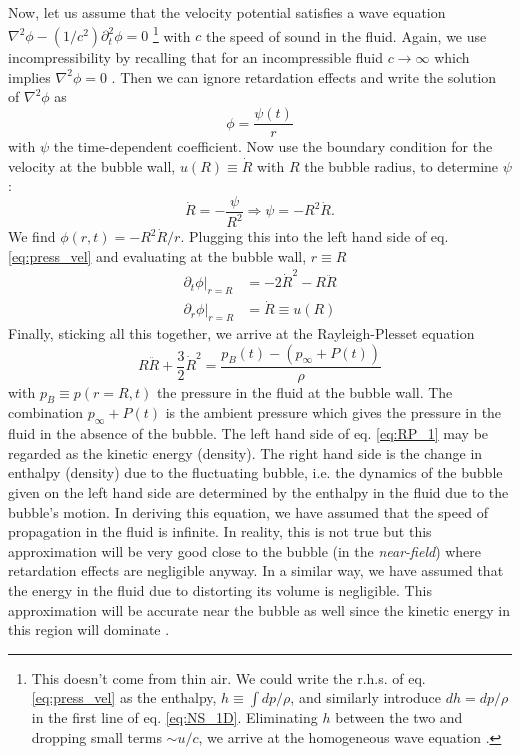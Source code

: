 \documentclass[prb,aps,nofootinbib,superscriptaddress,floatfix]{revtex4-2}
\begin{document}
Now, let us assume that the velocity potential satisfies a wave equation $\nabla^2 \phi - (1/c^2)\partial_t^2 \phi =0 $ \footnote{This doesn't come from thin air. We could write the r.h.s. of eq. \ref{eq:press_vel} as the enthalpy, $h\equiv \int dp/\rho$, and similarly introduce $dh=dp/\rho$ in the first line of eq. \ref{eq:NS_1D}. Eliminating $h$ between the two and dropping small terms $\sim u/c$, we arrive at the homogeneous wave equation \cite{leighton2007derivation,brenner2002single,prosperetti1999old}.} with $c$ the speed of sound in the fluid. Again, we use incompressibility by recalling that for an incompressible fluid $c\rightarrow \infty$ which implies $\nabla^2 \phi =0$ \cite{prosperetti1999old,prosperetti1986bubble,leighton2007derivation}. Then we can ignore retardation effects and write the solution of $\nabla^2 \phi$ as 
\begin{equation}
    \phi = \frac{\psi(t)}{r}
\end{equation}
with $\psi$ the time-dependent coefficient. Now use the boundary condition for the velocity at the bubble wall, $u(R)\equiv \dot{R}$ with $R$ the bubble radius, to determine $\psi$:
\begin{equation}
    \dot{R} = -\frac{\psi}{R^2} \Rightarrow \psi = -R^2 \dot{R}.
\end{equation}  
We find $\phi(r,t) = -R^2 \dot{R}/r$. Plugging this into the left hand side of eq. \ref{eq:press_vel} and evaluating at the bubble wall, $r\equiv R$
\begin{equation}
\begin{split}
    \partial_t \phi \vert_{r=R} & = -2\dot{R}^2-R\ddot{R} \\
    \partial_r \phi \vert_{r=R} & = \dot{R} \equiv u(R)
\end{split}
\end{equation}
Finally, sticking all this together, we arrive at the Rayleigh-Plesset equation \cite{prosperetti1999old,prosperetti1986bubble,leighton2007derivation,plesset1949dynamics,plesset1977bubble}
\begin{equation}
    R\ddot{R}+\frac{3}{2}\dot{R}^2 = \frac{p_B(t)-(p_\infty+P(t))}{\rho}
    \label{eq:RP_1}
\end{equation}
with $p_B \equiv p(r=R,t)$ the pressure in the fluid at the bubble wall. The combination $p_\infty+P(t)$ is the ambient pressure \cite{prosperetti1999old,prosperetti1986bubble} which gives the pressure in the fluid in the absence of the bubble. The left hand side of eq. \ref{eq:RP_1} may be regarded as the kinetic energy (density). The right hand side is the change in enthalpy (density) due to the fluctuating bubble, i.e. the dynamics of the bubble given on the left hand side are determined by the enthalpy in the fluid due to the bubble's motion. In deriving this equation, we have assumed that the speed of propagation in the fluid is infinite. In reality, this is not true but this approximation will be very good close to the bubble (in the \emph{near-field}) where retardation effects are negligible anyway. In a similar way, we have assumed that the energy in the fluid due to distorting its volume is negligible. This approximation will be accurate near the bubble as well since the kinetic energy in this region will dominate \cite{prosperetti1999old}.
\end{document}
